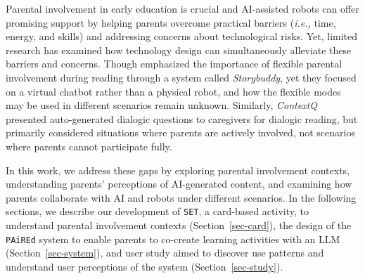 
Parental involvement in early education is crucial and AI-assisted robots can offer promising support by helping parents overcome practical barriers (\textit{i.e.,} time, energy, and skills) and addressing concerns about technological risks. Yet, limited research has examined how technology design can simultaneously alleviate these barriers and concerns. Though \citet{zhang2022storybuddy} emphasized the importance of flexible parental involvement during reading through a system called \textit{Storybuddy}, yet they focused on a virtual chatbot rather than a physical robot, and how the flexible modes may be used in different scenarios remain unknown. Similarly, \textit{ContextQ} \cite{dietz2024contextq} presented auto-generated dialogic questions to caregivers for dialogic reading, but primarily considered situations where parents are actively involved, not scenarios where parents cannot participate fully.

In this work, we address these gaps by exploring parental involvement contexts, understanding parents' perceptions of AI-generated content, and examining how parents collaborate with AI and robots under different scenarios. In the following sections, we describe our development of  \texttt{SET}, a card-based activity, to understand parental involvement contexts (Section~\ref{sec-card}), the design of the \texttt{PAiREd} system to enable parents to co-create learning activities with an LLM (Section~\ref{sec-system}), and user study aimed to discover use patterns and understand user perceptions of the system (Section~\ref{sec-study}).
